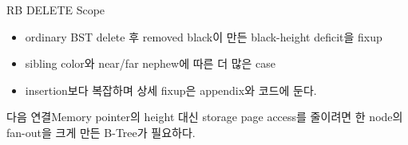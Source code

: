 \begin{frame}{RB DELETE Scope}
\begin{itemize}\item ordinary BST delete 후 removed black이 만든 black-height deficit을 fixup\item sibling color와 near/far nephew에 따른 더 많은 case\item insertion보다 복잡하며 상세 fixup은 appendix와 코드에 둔다.\end{itemize}
\begin{block}{다음 연결}Memory pointer의 height 대신 storage page access를 줄이려면 한 node의 fan-out을 크게 만든 B-Tree가 필요하다.\end{block}
\end{frame}

